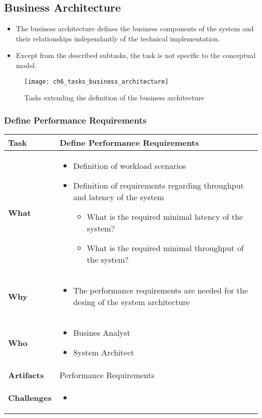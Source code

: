 \subsection{Business Architecture}

\begin{itemize}
	\item The business architecture defines the business components of the system and their relationships independantly of the technical implementation.
	\item Except from the described subtasks, the task is not specific to the conceptual model.
\end{itemize}

\begin{figure}[htpb] \centering 
	\texttt{[image: ch6\_tasks\_business\_architecture]} 
	\caption{Tasks extending the definition of the business architecture} 
	\label{fig:ch6_tasks_business_architecture} 
\end{figure}

\subsubsection{Define Performance Requirements}
\begin{tabularx}{\textwidth}{@{} l X @{}}
	\caption{Define Performance Requirements} \label{table:ch6_Task_Define_Performance Requirements}\\
	\toprule
	\bfseries Task & Define Performance Requirements\\
	\midrule\bfseries What & 
	\begin{itemize}
		\item Definition of workload scenarios
		\item Definition of requirements regarding throughput and latency of the system
		\begin{itemize}
			\item What is the required minimal latency of the system?
			\item What is the required minimal throughput of the system?
		\end{itemize}
	\end{itemize}
	\\
	\midrule
	\bfseries Why &
	\begin{itemize}
		\item The performance requirements are needed for the desing of the system architecture
	\end{itemize}\\
	\midrule
	\bfseries Who & 
	\begin{itemize}
		\item Busines Analyst
		\item System Architect
	\end{itemize}\\
	\midrule
	\bfseries Artifacts & Performance Requirements\\
	\midrule
	\bfseries Challenges & 
	\begin{itemize}
		\item 
	\end{itemize}\\
	\bottomrule
\end{tabularx}

